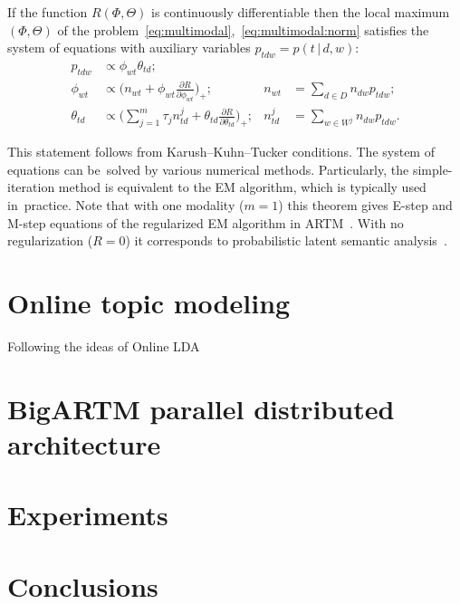 \documentclass{llncs}
\newcommand{\cond}{\mspace{3mu}{|}\mspace{3mu}}
\begin{document}
\begin{theorem}
\label{th:multimodal}
    If the function $R(\Phi,\Theta)$ is continuously differentiable
    then the local maximum $(\Phi,\Theta)$
    of the problem~\eqref{eq:multimodal},~\eqref{eq:multimodal:norm}
    satisfies the system of equations
    with auxiliary variables $p_{tdw} = p(t\cond d,w)$:
    \begin{align*}
        p_{tdw} &\propto \phi_{wt}\theta_{td};
    \\
        \phi_{wt} &\propto
            \biggl(
                n_{wt} + \phi_{wt} \frac{\partial R}{\partial \phi_{wt}}
            \biggr)_{\!\!+};
        &
        n_{wt} &= \sum_{d\in D} n_{dw} p_{tdw};
    \\
        \theta_{td} &\propto
            \biggl(
                \sum_{j=1}^m \tau_j n^j_{td} + \theta_{td} \frac{\partial R}{\partial \theta_{td}}
            \biggr)_{\!\!+};
        &
        n^j_{td} &= \sum_{w\in W^j} n_{dw} p_{tdw}.
    \end{align*}
\end{theorem}

This statement follows from Karush--Kuhn--Tucker conditions.
The system of equations can be~solved by various numerical methods.
Particularly,
the simple-iteration method is equivalent to the EM algorithm,
which is typically used in~practice.
Note that with one modality (${m=1}$)
this theorem gives E-step and M-step equations of the regularized EM algorithm
in ARTM~\cite{voron14aist,voron14mlj}.
With no regularization (${R=0}$) it corresponds to 
probabilistic latent semantic analysis~\cite{hofmann99plsi}. 

\section{Online topic modeling}
\label{sec:Online}

Following the ideas of Online LDA \cite{hoffman10online}

\section{BigARTM parallel distributed architecture}
\label{sec:BigARTM}

\section{Experiments}
\label{sec:Experiments}

\section{Conclusions}
\label{sec:Conclusions}
\end{document}
